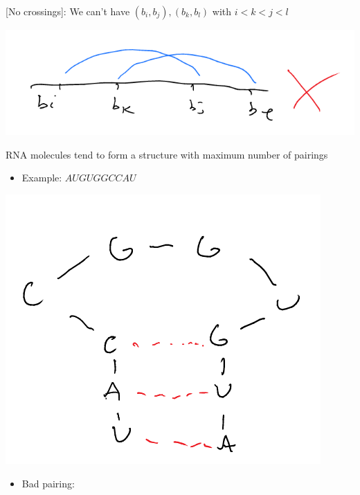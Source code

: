 \documentclass[11pt]{article}
\begin{document}
[No crossings]: We can't have \((b_i,b_j),(b_k,b_l)\) with \(i<k<j<l\)
\begin{center}
\includegraphics[width=.9\linewidth]{./Images/i88.png}
\end{center}
RNA molecules tend to form a structure with maximum number of pairings
\begin{itemize}
\item Example: \(AUGUGGCCAU\)
\end{itemize}
\begin{center}
\includegraphics[width=.9\linewidth]{./Images/i89.png}
\end{center}
\begin{itemize}
\item Bad pairing:
\end{itemize}
\end{document}
